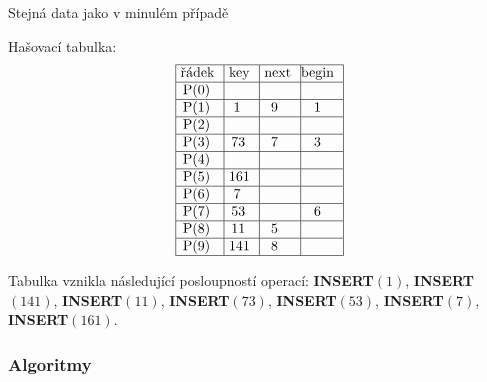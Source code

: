 \documentclass[a4paper,12pt]{article}
\begin{document}
Stejná data jako v minulém případě\newline 

Hašovací tabulka:
$$\vtop{\offinterlineskip\halign {\strut\vrule\ # & \vrule\ # & \vrule\ # & \vrule \hfil # \hfil \vrule\cr\noalign{\hrule}řádek & key & next & begin \hfil \cr\noalign{\hrule}P(0) & & & \hfill \cr\noalign{\hrule}P(1) & 1 & 9 & 1 \cr\noalign{\hrule}P(2) & & & \hfill \cr\noalign{\hrule}P(3) & 73 & 7 & 3 \cr\noalign{\hrule}P(4) & & &\hfill \cr\noalign{\hrule}P(5) & 161 & & \hfill \cr\noalign{\hrule}P(6) & 7 & & \hfill \cr\noalign{\hrule}P(7) & 53 & & 6 \cr\noalign{\hrule}P(8) & 11 & 5 & \hfill \cr\noalign{\hrule}P(9) & 141 & 8 & \hfill \cr\noalign{\hrule}}}$$

Tabulka vznikla následující posloupností 
operací:\newline 
{\bf INSERT$(1)$}, {\bf INSERT$(141)$}, {\bf INSERT$(11)$}, {\bf INSERT$
(73)$}, 
{\bf INSERT$(53)$}, {\bf INSERT$(7)$}, {\bf INSERT$(161)$}. 

\subsubsection{Algoritmy}
\end{document}
